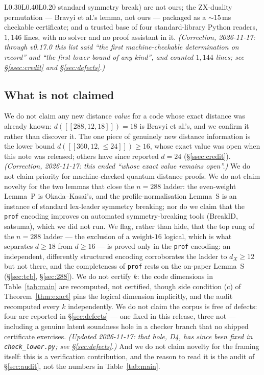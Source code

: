 \documentclass[11pt]{amsart}
\newcommand{\dX}{d_{X}}
\theoremstyle{plain}
\theoremstyle{definition}
\theoremstyle{remark}
\begin{document}
\begin{table}[t]
\begin{tabular}{L{0.30\textwidth}L{0.40\textwidth}L{0.20\textwidth}}
{standard symmetry break) are not ours; the ZX-duality permutation --- Bravyi et
al.'s lemma, not ours --- packaged as a $\sim$$15$\,ms checkable certificate;
and a trusted base of four standard-library Python readers, $1{,}146$ lines,
with no solver and no proof assistant in it. \emph{(Correction, 2026-11-17:
through v0.17.0 this list said ``the first machine-checkable determination on
record'' and ``the first lower bound of any kind'', and counted $1{,}144$
lines; see \S\ref{ssec:credit} and \S\ref{sec:defects}.)}}\\
\bottomrule
\end{tabular}
\medskip
\caption{Claim-by-claim provenance.}
\label{tab:credit}
\end{table}

\subsection{What is not claimed}\label{ssec:notclaimed}
We do not claim any new distance \emph{value} for a code whose exact distance
was already known: $d([[288,12,18]])=18$ is Bravyi et al.'s, and we confirm it
rather than discover it. The one piece of genuinely new distance information is
the lower bound $d([[360,12,\le24]])\ge16$, whose exact value was open when
this note was released; others have since reported $d=24$
(\S\ref{ssec:credit}). \emph{(Correction, 2026-11-17: this ended ``whose
exact value remains open''.)} We
do not claim priority for machine-checked quantum distance proofs. We do not
claim novelty for the two lemmas that close the $n=288$ ladder: the even-weight
Lemma~P is Okada--Kasai's, and the profile-normalisation Lemma~S is an instance
of standard lex-leader symmetry breaking; nor do we claim that the \texttt{prof}
encoding improves on automated symmetry-breaking tools (BreakID, satsuma),
which we did not run. We flag, rather than hide, that the top rung of the
$n=288$ ladder --- the exclusion of a weight-$16$ logical, which is what
separates $d\ge18$ from $d\ge16$ --- is proved only in the \texttt{prof}
encoding: an independent, differently structured encoding corroborates the
ladder to $\dX\ge12$ but not there, and the completeness of \texttt{prof} rests
on the on-paper Lemma~S (\S\ref{sec:tcb}, \S\ref{sec:288}). We do not certify
$k$: the code dimensions in Table~\ref{tab:main} are
recomputed, not certified, though side condition (c) of
Theorem~\ref{thm:exact} pins the logical dimension implicitly, and the audit
recomputed every $k$ independently. We do not claim the corpus is free of
defects: four are reported in \S\ref{sec:defects} --- one fixed in this
release, three not --- including a genuine latent soundness hole in a checker
branch that no shipped certificate exercises. \emph{(Updated 2026-11-17: that
hole, D4, has since been fixed in \texttt{check\_lower.py}; see
\S\ref{sec:defects}.)} And we do not claim novelty for
the framing itself: this is a verification contribution, and the reason to
read it is the audit of \S\ref{sec:audit}, not the numbers in
Table~\ref{tab:main}.
\end{document}
